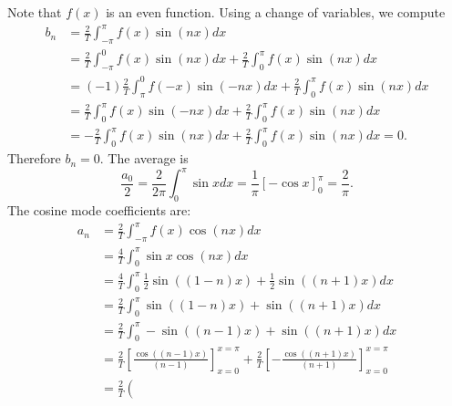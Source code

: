 \documentclass[11pt]{article}
\begin{document}
\begin{solution}     
    Note that $f(x)$ is an even function.
    Using a change of variables, we compute 
    \begin{align*}
        b_n
        &=
        \frac{2}{T}
        \int_{-\pi}^{\pi} f(x) \sin(n x) dx
        \\&
        = 
        \frac{2}{T}
        \int_{-\pi}^{0} f(x) \sin(n x) dx
        +
        \frac{2}{T}
        \int_{0}^{\pi} f(x) \sin(n x) dx
        \\&
        = 
        (-1)
        \frac{2}{T}
        \int_{\pi}^{0} f(-x) \sin( -n x) dx
        +
        \frac{2}{T}
        \int_{0}^{\pi} f(x) \sin(n x) dx
        \\&
        = 
        \frac{2}{T}
        \int_{0}^{\pi} f(x) \sin( -n x) dx
        +
        \frac{2}{T}
        \int_{0}^{\pi} f(x) \sin(n x) dx
        \\&
        = 
        -
        \frac{2}{T}
        \int_{0}^{\pi} f(x) \sin(n x) dx
        +
        \frac{2}{T}
        \int_{0}^{\pi} f(x) \sin(n x) dx
        =
        0
        .
    \end{align*}
    Therefore $b_n = 0$. 
    The average is 
	\[
        \frac{a_0}{2} = \frac{2}{2\pi} \int_{0}^{\pi} \sin x dx  =  \frac{1}{\pi}\left[ - \cos{x} \right]_{0}^{\pi} =\frac{2}{\pi} .
    \]
    The cosine mode coefficients are:
    \begin{align*}
            a_n 
            &
            = 
            \frac{2}{T}
            \int_{-\pi}^{\pi} f(x)   \cos(n x) dx
            \\&
            = 
            \frac{4}{T}
            \int_{0}^{\pi} \sin x \cos(n x) dx
            \\&
            =
            \frac{4}{T}
            \int_{0}^{\pi} \frac 1 2 \sin((1-n)x) + \frac 1 2 \sin((n+1)x) dx
            \\&
            =
            \frac{2}{T}
            \int_{0}^{\pi} \sin((1-n)x) + \sin((n+1)x) dx
            \\&
            =
            \frac{2}{T}
            \int_{0}^{\pi} -\sin((n-1)x) + \sin((n+1)x) dx
            \\&
            =
            \frac{2}{T}
            \left[\frac{ \cos((n-1)x) }{ (n-1) } \right]_{x=0}^{x=\pi}
            +
            \frac{2}{T}
            \left[- \frac{ \cos((n+1)x) }{ (n+1) } \right]_{x=0}^{x=\pi}
            \\&
            = 
            \frac 2 T 
            \left( 

\end{align*}
\end{solution}
\end{document}
